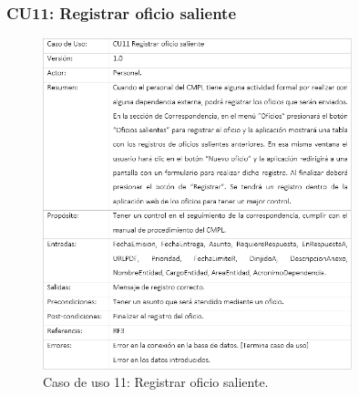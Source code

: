 		\subsubsection{CU11: Registrar oficio saliente}
\begin{figure}[htbp!]
		\centering
			\includegraphics[width=0.8\textwidth]{images/CU/CU11}
		\caption{Caso de uso 11: Registrar oficio saliente.}
		\label{Tabla}
	\end{figure}

